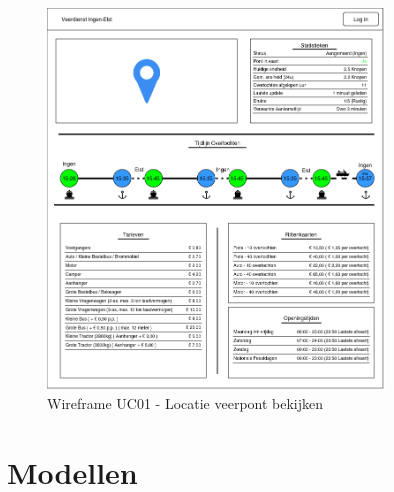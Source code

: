 \documentclass{article}
\begin{document}
\begin{figure}[H]
    \centering
    \includegraphics[width=0.8\textwidth]{images/wireframe_startpagina.png}
    \caption{Wireframe UC01 - Locatie veerpont bekijken}
    \label{fig:wf1}
\end{figure}

\section{Modellen}
\end{document}
